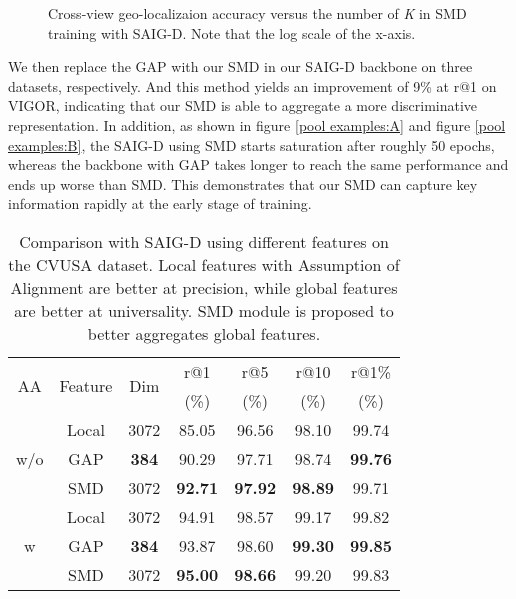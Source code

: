 \documentclass[sn-basic,iicol]{sn-jnl}
\theoremstyle{thmstyletwo}\newtheorem{example}{Example}\newtheorem{remark}{Remark}
\theoremstyle{thmstylethree}\newtheorem{definition}{Definition}
\begin{document}
\begin{figure}[ht] \begin{minipage}[t]{0.33\linewidth} \centering

\label{fig1} \end{minipage}\begin{minipage}[t]{0.33\linewidth}
\centering
{}
\label{fig2}
\end{minipage}\begin{minipage}[t]{0.33\linewidth}
\centering
{}
\label{fig2}
\end{minipage}

\caption{Cross-view geo-localizaion accuracy versus the number of \emph{K} in SMD training with SAIG-D. Note that the log scale of the x-axis.}
\label{pool_k}
\vspace{-10pt}
\end{figure}

 We then replace the GAP with our SMD in our SAIG-D backbone on three datasets, respectively. And this method yields an improvement of 9\% at r@1 on VIGOR, indicating that our SMD is able to aggregate a more discriminative representation. In addition, as shown in figure \ref{pool examples:A} and figure \ref{pool examples:B}, the SAIG-D using SMD starts saturation after roughly 50 epochs, whereas the backbone with GAP takes longer to reach the same performance and ends up worse than SMD. This demonstrates that our SMD can capture key information rapidly at the early stage of training.



\begin{table}[!htbp]
\setlength{\abovecaptionskip}{0.2cm}
\centering
\begin{tabular}{c|c|c|c|c|c|c}
\toprule
\multirow{2}{*}{AA} & \multirow{2}{*}{Feature}& \multirow{2}{*}{Dim} & r@1 & r@5 & r@10 & r@1\% \\ 
~ & ~& ~ & (\%) & (\%) & (\%) & (\%) \\\midrule
\multirow{3}{*}{w/o} & Local & 3072 &85.05&96.56&98.10&99.74\\
~& GAP &\textbf{384} &90.29&97.71&98.74&\textbf{99.76}\\ 
~& SMD &3072 &\textbf{92.71}&\textbf{97.92}&\textbf{98.89}&99.71\\ \midrule
\multirow{3}{*}{w} & Local & 3072 &94.91&98.57&99.17&99.82 \\
~& GAP & \textbf{384} &93.87&98.60&\textbf{99.30}&\textbf{99.85} \\ 
~& SMD &3072 &\textbf{95.00}&\textbf{98.66}&99.20&99.83\\ \bottomrule
\end{tabular}
\caption{Comparison with SAIG-D using different features on the CVUSA dataset. Local features with Assumption of Alignment are better at precision, while global features are better at universality. SMD module is proposed to better aggregates global features. }
\label{global vs local}
\end{table}
\end{document}
